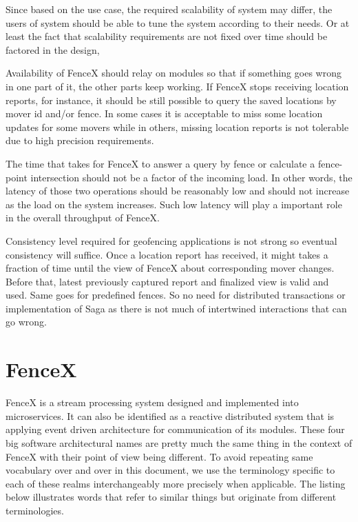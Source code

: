 \documentclass[a4]{report}
\begin{document}
    Since based on the use case, the required scalability of system may differ, the users of system should be able to
    tune the system according to their needs.
    Or at least the fact that scalability requirements are not fixed over time should be factored in the design,

    Availability of FenceX should relay on modules so that if something goes wrong in one part of it, the other parts
    keep working.
    If FenceX stops receiving location reports, for instance, it should be still possible to query the saved
    locations by mover id and/or fence.
    In some cases it is acceptable to miss some location updates for some movers while in others, missing location
    reports is not tolerable due to high precision requirements.

    The time that takes for FenceX to answer a query by fence or calculate a fence-point intersection should not be a
    factor of the incoming load.
    In other words, the latency of those two operations should be reasonably low and should not increase as the load
    on the system increases.
    Such low latency will play a important role in the overall throughput of FenceX.

    Consistency level required for geofencing applications is not strong so eventual consistency will suffice.
    Once a location report has received, it might takes a fraction of time until the view of FenceX about
    corresponding mover changes.
    Before that, latest previously captured report and finalized view is valid and used.
    Same goes for predefined fences.
    So no need for distributed transactions or implementation of Saga as there is not much of intertwined
    interactions that can go wrong.


    \chapter{FenceX}
    FenceX is a stream processing system designed and implemented into microservices.
    It can also be identified as a reactive distributed system that is applying event driven architecture for
    communication of its modules.
    These four big software architectural names are pretty much the same thing in the context of FenceX with their
    point of view being different.
    To avoid repeating same vocabulary over and over in this document, we use the terminology specific to each of
    these realms interchangeably more precisely when applicable.
    The listing below illustrates words that refer to similar things but originate from different terminologies.
\end{document}
